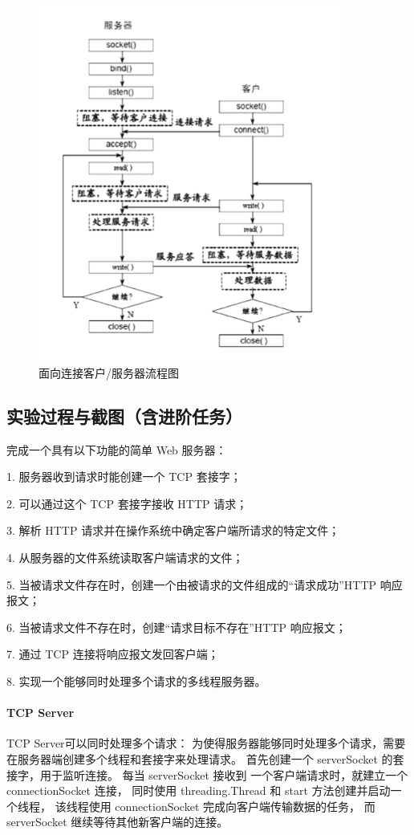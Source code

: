 \documentclass[a4paper,12pt]{report}
\begin{document}
\begin{spacing}{1.5}
\begin{figure}[H]
  \centering
\includegraphics[width=10cm]{figure/2.png}
\caption{面向连接客户/服务器流程图}
\label{2}
\end{figure}

\subsection{实验过程与截图（含进阶任务）}
完成一个具有以下功能的简单 Web 服务器：

1. 服务器收到请求时能创建一个 TCP 套接字；

2. 可以通过这个 TCP 套接字接收 HTTP 请求；

3. 解析 HTTP 请求并在操作系统中确定客户端所请求的特定文件；

4. 从服务器的文件系统读取客户端请求的文件；

5. 当被请求文件存在时，创建一个由被请求的文件组成的“请求成功”HTTP 响应报文；

6. 当被请求文件不存在时，创建“请求目标不存在”HTTP 响应报文；

7. 通过 TCP 连接将响应报文发回客户端；

8. 实现一个能够同时处理多个请求的多线程服务器。

\paragraph*{TCP Server}
TCP Server可以同时处理多个请求：
为使得服务器能够同时处理多个请求，需要在服务器端创建多个线程和套接字来处理请求。
首先创建一个 serverSocket 的套接字，用于监听连接。
每当 serverSocket 接收到 一个客户端请求时，就建立一个 connectionSocket 连接，
同时使用 threading.Thread 和 start 方法创建并启动一个线程，
该线程使用 connectionSocket 完成向客户端传输数据的任务，
而 serverSocket 继续等待其他新客户端的连接。


\end{spacing}
\end{document}
